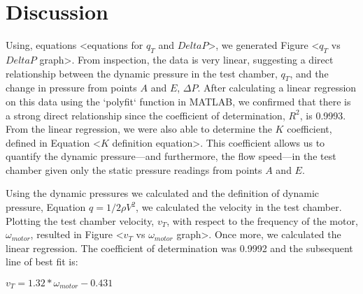 \chapter{Discussion} 
\label{cp:discussion}
Using, equations <equations for $q_T$ and $Delta P$>, we generated Figure <$q_T$ vs $Delta P$ graph>. From inspection, the data is very linear, suggesting a direct relationship between the dynamic pressure in the test chamber, $q_T$, and the change in pressure from points $A$ and $E$, $\Delta P$. After calculating a linear regression on this data using the `polyfit` function in MATLAB, we confirmed that there is a strong direct relationship since the coefficient of determination, $R^2$, is 0.9993. From the linear regression, we were also able to determine the $K$ coefficient, defined in Equation <$K$ definition equation>. This coefficient allows us to quantify the dynamic pressure—and furthermore, the flow speed—in the test chamber given only the static pressure readings from points $A$ and $E$. \par
Using the dynamic pressures we calculated and the definition of dynamic pressure, Equation $q=1/2 \rho V^2$, we calculated the velocity in the test chamber. Plotting the test chamber velocity, $v_T$, with respect to the frequency of the motor, $\omega _{motor}$, resulted in Figure <$v_T$ vs $\omega _{motor}$ graph>. Once more, we calculated the linear regression. The coefficient of determination was 0.9992 and the subsequent line of best fit is: 
\begin{center}
    $v_T = 1.32 * \omega _{motor} - 0.431 $
\end{center}

